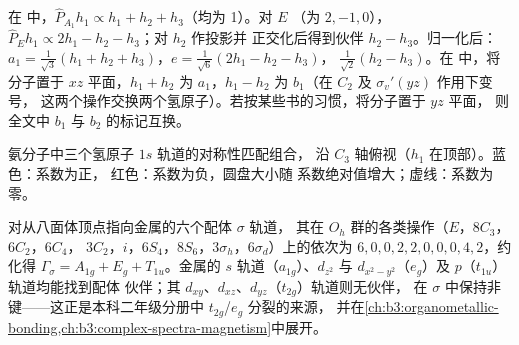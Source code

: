 \begin{example}[氨与水的组合]\label{ex:b3:group-theory-applied:salcs}
在  中，$\hat P_{A_1}h_1 \propto h_1 + h_2 + h_3$（均为 1）。对 $E$
（为 $2, -1, 0$），$\hat P_Eh_1 \propto 2h_1 - h_2 - h_3$；对 $h_2$ 作投影并
正交化后得到伙伴 $h_2 - h_3$。归一化后：$a_1 =
\frac{1}{\sqrt3}(h_1 + h_2 + h_3)$，$e = \frac{1}{\sqrt6}(2h_1 - h_2 - h_3)$，
$\frac{1}{\sqrt2}(h_2 - h_3)$。在  中，将分子置于 $xz$ 平面，$h_1 + h_2$ 为
$a_1$，$h_1 - h_2$ 为 $b_1$（在 $C_2$ 及 $\sigma_v'(yz)$ 作用下变号，
这两个操作交换两个氢原子）。若按某些书的习惯，将分子置于 $yz$ 平面，
则全文中 $b_1$ 与 $b_2$ 的标记互换。
\end{example}

\begin{omfigure}

{\small 氨分子中三个氢原子 $1s$ 轨道的对称性匹配组合，
沿 $C_3$ 轴俯视（$h_1$ 在顶部）。蓝色：系数为正，
红色：系数为负，圆盘大小随
系数绝对值增大；虚线：系数为零。}
\end{omfigure}

\begin{example}[金属周围的六个配体]\label{ex:b3:group-theory-applied:ml6}
对从八面体顶点指向金属的六个配体 $\sigma$ 轨道，
其在 $O_h$ 群的各类操作（$E$，$8C_3$，$6C_2$，$6C_4$，
$3C_2$，$i$，$6S_4$，$8S_6$，$3\sigma_h$，$6\sigma_d$）上的依次为 $6, 0, 0, 2, 2, 0, 0, 0, 4,
2$，约化得 $\Gamma_\sigma = A_{1g} + E_g + T_{1u}$。金属的 $s$
轨道（$a_{1g}$）、$d_{z^2}$ 与 $d_{x^2-y^2}$（$e_g$）及 $p$（$t_{1u}$）轨道均能找到配体
伙伴；其 $d_{xy}$、$d_{xz}$、$d_{yz}$（$t_{2g}$）轨道则无伙伴，
在 $\sigma$ 中保持非键——这正是本科二年级分册中 $t_{2g}$/$e_g$ 分裂的来源，
并在\cref{ch:b3:organometallic-bonding,ch:b3:complex-spectra-magnetism}中展开。
\end{example}

